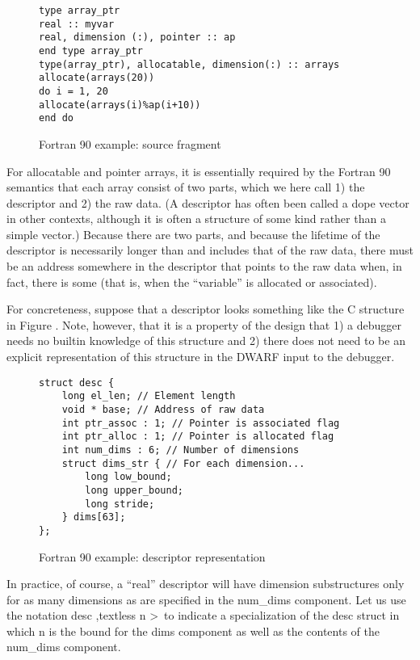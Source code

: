 \begin{figure}[here]
\begin{lstlisting}
type array_ptr
real :: myvar
real, dimension (:), pointer :: ap
end type array_ptr
type(array_ptr), allocatable, dimension(:) :: arrays
allocate(arrays(20))
do i = 1, 20
allocate(arrays(i)%ap(i+10))
end do
\end{lstlisting}
\caption{Fortran 90 example: source fragment} \label{fig:fortran90examplesourcefragment}
\end{figure}

For allocatable and pointer arrays, it is essentially required
by the Fortran 90 semantics that each array consist of two
parts, which we here call 1) the descriptor and 2) the raw
data. (A descriptor has often been called a dope vector in
other contexts, although it is often a structure of some kind
rather than a simple vector.) Because there are two parts,
and because the lifetime of the descriptor is necessarily
longer than and includes that of the raw data, there must be
an address somewhere in the descriptor that points to the
raw data when, in fact, there is some (that is, when 
the ``variable'' is allocated or associated).

For concreteness, suppose that a descriptor looks something
like the C structure in 
Figure .
Note, however, that it is
a property of the design that 1) a debugger needs no builtin
knowledge of this structure and 2) there does not need to
be an explicit representation of this structure in the DWARF
input to the debugger.

\begin{figure}[here]
\begin{lstlisting}
struct desc {
    long el_len; // Element length
    void * base; // Address of raw data
    int ptr_assoc : 1; // Pointer is associated flag
    int ptr_alloc : 1; // Pointer is allocated flag
    int num_dims : 6; // Number of dimensions
    struct dims_str { // For each dimension...  
        long low_bound;
        long upper_bound;
        long stride;
    } dims[63];
};
\end{lstlisting}
\caption{Fortran 90 example: descriptor representation} \label{fig:fortran90exampledescriptorrepresentation}
\end{figure}


In practice, of course, a “real” descriptor will have
dimension substructures only for as many dimensions as are
specified in the num\_dims component. Let us use the notation
desc ,textless n \textgreater\   
to indicate a specialization of the desc struct in
which n is the bound for the dims component as well as the
contents of the num\_dims component.

